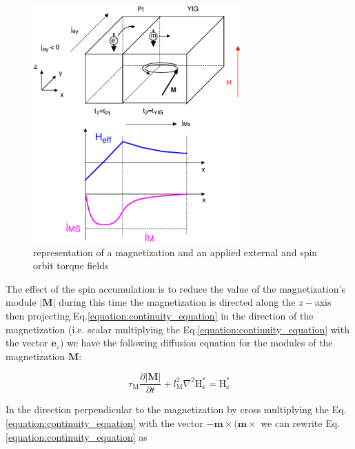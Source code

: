 \documentclass[review]{elsarticle}
\begin{document}

\begin{figure}[htbp]
\begin{center}
\includegraphics[width=8cm]{scheme.pdf}
\caption{representation of a magnetization and an applied external and spin orbit torque fields}
\label{scheme}
\end{center}
\end{figure}


The effect of the spin accumulation is to reduce the value of the magnetization's module $|\mathbf{M}|$ during this time the 
magnetization is directed along the $z-$axis then projecting Eq.\ref{equation:continuity_equation} in the direction of the magnetization  
(i.e.  scalar multiplying  the Eq.\ref{equation:continuity_equation} with the vector $\mathbf{e}_z)$ we have the following diffusion 
equation  for the modules of the magnetization $\mathbf{M}$: 


\begin{equation}
\tau_\mathrm{\scriptstyle{M}}\frac{\partial \mathbf{|M|}}{\partial t} + l_\mathrm{\scriptstyle{M}}^2 \nabla^2 \mathrm{H}_{\mathrm{\scriptstyle{z}}}^*  
= \mathrm{H}_{\mathrm{\scriptstyle{z}}}^* 
\end{equation}

In the direction perpendicular to the magnetization by cross multiplying the Eq.\ref{equation:continuity_equation} with the vector $-\mathbf{m}\times(\mathbf{m}\times$ we can 
rewrite Eq.\ref{equation:continuity_equation} as
\end{document}
